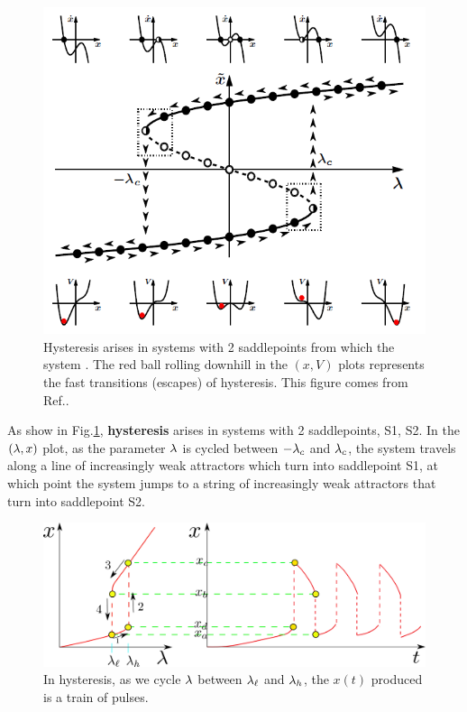 \begin{figure}[h!]
 \centering
 \includegraphics[width=5in]
 {dynamical-sys/hysteresis-2-saddle-points.png}
 \caption{Hysteresis arises in systems with  2 saddlepoints from which the system . The red ball rolling downhill in the $(x,V)$
 plots represents
 the fast transitions (escapes) of hysteresis. This
 figure  comes from Ref.\cite{dynamical-fuchs}.}
 \label{fig-hysteresis-2-saddle-point}
 \end{figure}
 
 As show in Fig.\ref{fig-hysteresis-2-saddle-point}, {\bf hysteresis}
 arises in systems with 2 saddlepoints, S1, S2. In the $(\lambda, x)$ plot,
 as the parameter $\lambda$ is 
 cycled between $-\lambda_c$ and $\lambda_c$,
 the system travels along a
 line of increasingly weak attractors which turn into  saddlepoint S1, at which point the system jumps to a string of increasingly weak attractors
 that turn into saddlepoint S2.

 \begin{figure}[h!]
\centering
\includegraphics[width=5in]
{dynamical-sys/hysteresis.png}
\caption{In hysteresis,
as we cycle 
$\lambda$ between $\lambda_\ell$ and $\lambda_h$, the $x(t)$ 
produced is a
train of pulses.}
\label{fig-hysteresis}
\end{figure}

